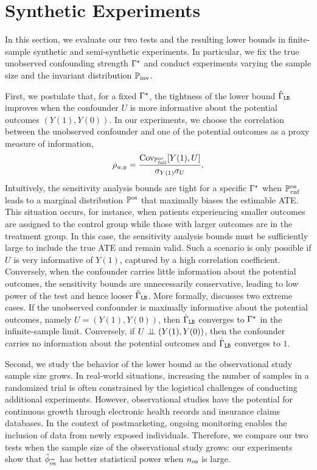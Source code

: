 



\section{Synthetic Experiments}
\label{sec:syn_exp}
In this section, we evaluate our two tests and the resulting lower bounds in finite-sample synthetic and semi-synthetic experiments. In particular, we fix the true unobserved confounding strength $\Gamma^{\star}$ and conduct experiments varying the sample size and the invariant distribution $\mathbb{P} _{\operatorname{inv}}$. 

First, we postulate that, for a fixed $\Gamma^{\star}$,
the tightness of 
the lower bound $\hat{\Gamma}_{\texttt{LB}}$ improves when the confounder $U$ is more informative about the potential outcomes $(Y(1),Y(0))$. In our experiments, we choose the correlation between 
the unobserved confounder and one of the potential outcomes as a proxy measure of information,
\begin{equation}  
\label{eq:correlation}
\rho_{u,y} = \frac{\operatorname{Cov}_{\mathbb{P} ^{\operatorname{os}}_{\operatorname{full}}}[Y(1),U]}{\sigma_{Y(1)} \sigma_U}.
\end{equation}
Intuitively, the sensitivity analysis bounds are tight for a specific $\Gamma^{\star}$ when $\mathbb{P}_{\operatorname{cnf}}^{\operatorname{os}}$ leads to a marginal distribution $\mathbb{P}^{\operatorname{os}}$ that maximally biases the estimable ATE. This situation occurs, for instance, when patients experiencing smaller outcomes are assigned to the control group while those with larger outcomes are in the treatment group. In this case, the sensitivity analysis bounds must be sufficiently large to include the true ATE and remain valid. 
Such a scenario is only possible if $U$ is very informative of $Y(1)$, captured by a high correlation coefficient. 
Conversely, when the confounder carries little information about the potential outcomes, the sensitivity bounds are unnecessarily conservative, leading to low power of the test and hence looser $\hat{\Gamma}_{\texttt{LB}}$. More formally,  discusses two extreme cases. If the unobserved confounder is maximally informative about the potential outcomes, namely \(U=(Y(1),Y(0))\), then \(\hat{\Gamma}_{\texttt{LB}}\) converges to \(\Gamma^{\star}\) in the infinite-sample limit. Conversely, if \(U \perp \!\!\! \perp (Y(1),Y(0))\), then the confounder carries no information about the potential outcomes and \(\hat{\Gamma}_{\texttt{LB}} \) converges to $1$. 
 

Second,  we study the behavior of the lower bound as the observational study sample size grows. In real-world situations, increasing the number of samples in a randomized trial is often constrained by the logistical challenges of conducting additional experiments. However, observational studies have the potential for continuous growth through electronic health records and insurance claims databases. In the context of postmarketing, ongoing monitoring enables the inclusion of data from newly exposed individuals. Therefore, we compare our two tests when the sample size of the observational study grows: our experiments show that $\hat{\phi}_{\widetilde{\mathrm{os}}}$ has better statistical power when $n_{\operatorname{os}}$ is large.
